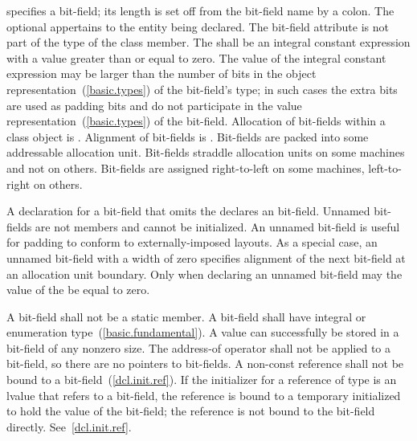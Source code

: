 %
%
specifies a bit-field;
its length is set off from the bit-field name by a colon. The optional  appertains to the entity being declared. The bit-field
attribute is not part of the type of the class member. The
 shall be an integral constant expression
with a value greater than or equal to zero. The
value of the integral constant expression may
be larger than the number of bits in the object
representation~(\ref{basic.types}) of the bit-field's type; in such
cases the extra bits are used as padding bits and do not participate in
the value representation~(\ref{basic.types}) of the bit-field.
%
Allocation of bit-fields within a class object is
.
%
Alignment of bit-fields is .
%
Bit-fields are packed into some addressable allocation unit.
\enternote
Bit-fields straddle allocation units on some machines and not on others.
Bit-fields are assigned right-to-left on some machines, left-to-right on
others.
\exitnote

\pnum
{}%
A declaration for a bit-field that omits the 
declares an  bit-field. Unnamed bit-fields are not
members and cannot be initialized.
\enternote
An unnamed bit-field is useful for padding to conform to
externally-imposed layouts.
\exitnote
{}%
%
As a special case, an unnamed bit-field with a width of zero specifies
alignment of the next bit-field at an allocation unit boundary. Only
when declaring an unnamed bit-field may the value of the
 be equal to zero.

\pnum
{}%
A bit-field shall not be a static member. A bit-field shall have
integral or enumeration type~(\ref{basic.fundamental}).
%
A  value can successfully be stored in a bit-field of any
nonzero size.
%
The address-of operator \tcode{\&} shall not be applied to a bit-field,
so there are no pointers to bit-fields.
%
%
%
A non-const reference shall not be bound to a
bit-field~(\ref{dcl.init.ref}).
\enternote
If the initializer for a reference of type   is
an lvalue that refers to a bit-field, the reference is bound to a
temporary initialized to hold the value of the bit-field; the reference
is not bound to the bit-field directly. See~\ref{dcl.init.ref}.
\exitnote

